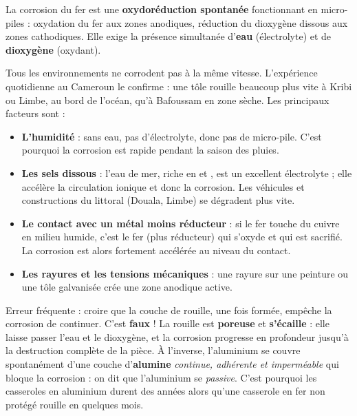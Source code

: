\documentclass[11pt]{article}
\newcounter{popsec}
\newcounter{popsub}
\newcommand{\courssub}[1]{%
  \stepcounter{popsub}%
  \par\vspace{9pt}\noindent{\popxbold\fontsize{11.5}{13}\selectfont\color{popink}{\color{poporange}\thepopsec.\thepopsub}\hspace{6pt}#1}\par\nopagebreak\vspace{4pt}
}
\begin{document}
\begin{aretenir}
La corrosion du fer est une \textbf{oxydoréduction spontanée} fonctionnant en micro-piles : oxydation du fer aux zones anodiques, réduction du dioxygène dissous aux zones cathodiques. Elle exige la présence simultanée d'\textbf{eau} (électrolyte) et de \textbf{dioxygène} (oxydant).
\end{aretenir}

\courssub{Facteurs favorisant la corrosion}

Tous les environnements ne corrodent pas à la même vitesse. L'expérience quotidienne au Cameroun le confirme : une tôle rouille beaucoup plus vite à Kribi ou Limbe, au bord de l'océan, qu'à Bafoussam en zone sèche. Les principaux facteurs sont :

\begin{itemize}
\item \textbf{L'humidité} : sans eau, pas d'électrolyte, donc pas de micro-pile. C'est pourquoi la corrosion est rapide pendant la saison des pluies.
\item \textbf{Les sels dissous} : l'eau de mer, riche en  et , est un excellent électrolyte ; elle accélère la circulation ionique et donc la corrosion. Les véhicules et constructions du littoral (Douala, Limbe) se dégradent plus vite.
\item \textbf{Le contact avec un métal moins réducteur} : si le fer touche du cuivre en milieu humide, c'est le fer (plus réducteur) qui s'oxyde et qui est sacrifié. La corrosion est alors fortement accélérée au niveau du contact.
\item \textbf{Les rayures et les tensions mécaniques} : une rayure sur une peinture ou une tôle galvanisée crée une zone anodique active.
\end{itemize}

\begin{attention}
Erreur fréquente : croire que la couche de rouille, une fois formée, empêche la corrosion de continuer. C'est \textbf{faux} ! La rouille est \textbf{poreuse} et \textbf{s'écaille} : elle laisse passer l'eau et le dioxygène, et la corrosion progresse en profondeur jusqu'à la destruction complète de la pièce. À l'inverse, l'aluminium se couvre spontanément d'une couche d'\textbf{alumine}  \emph{continue, adhérente et imperméable} qui bloque la corrosion : on dit que l'aluminium se \emph{passive}. C'est pourquoi les casseroles en aluminium durent des années alors qu'une casserole en fer non protégé rouille en quelques mois.
\end{attention}
\end{document}
